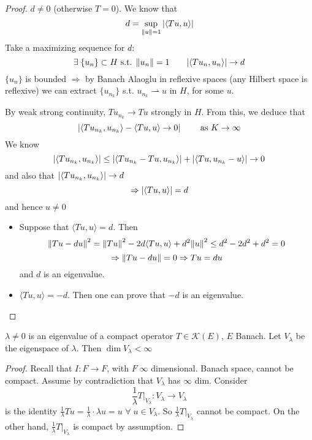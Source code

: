 \begin{proof}
    \(d \neq 0\) (otherwise \(T=0\)). We know that
    \[
        d = \sup_{\norm{u}=1} \abs{\langle Tu, u\rangle}
    \]
    Take a maximizing sequence for \(d\):
    \[
        \exists \; \{u_n\} \subset H \text{ s.t. } \norm{u_n}=1 \qquad \abs{\langle Tu_n, u_n\rangle} \to d    
    \]
    \(\{u_n\}\) is bounded \(\Rightarrow\) by Banach Alaoglu in reflexive spaces (any Hilbert space is reflexive) we can extract \(\{u_{n_k}\}\) s.t. \(u_{n_k} \rightharpoonup u\)  in \(H\), for some \(u\).

    By weak strong continuity, \(T u_{n_k} \to Tu\) strongly in \(H\). From this, we deduce that 
    \[
        \abs{ \langle T u_{n_k}, u_{n_k}\rangle - \langle Tu, u\rangle \to 0} \qquad \text{ as } K \to \infty    
    \]
    We know
    \[
        \abs{ \langle Tu_{n_k}, u_{n_k}\rangle} \leq \abs{\langle T u_{n_k} - Tu, u_{n_k}\rangle} + \abs{ \langle Tu, u_{n_k} - u\rangle} \to 0
    \]
    and also that \(\abs{\langle T u_{n_k}, u_{n_k}\rangle} \to d\)
    \[
        \Rightarrow \abs{\langle Tu, u\rangle} = d
    \]
    and hence \(u \neq 0\)

    \begin{itemize}
        \item Suppose that \(\langle Tu, u\rangle = d\). Then
        \[
            \norm{Tu- du}^2 = \norm{Tu}^2 - 2d \langle Tu, u\rangle + d^2 \norm{u}^2 \leq d^2 - 2d^2 + d^2 = 0
        \]
        \[
            \Rightarrow \norm{Tu - du} = 0 \Rightarrow Tu = du
        \]
        and \(d\) is an eigenvalue.
        \item \(\langle Tu, u\rangle = -d\). Then one can prove that \(-d\) is an eigenvalue.
    \end{itemize}
\end{proof}

\begin{proposition}
    \(\lambda \neq 0\) is an eigenvalue of a compact operator \(T \in \mathcal{K}(E)\), \(E \) Banach. Let \(V_\lambda\) be the eigenspace of \(\lambda\). Then \(\dim V_\lambda < \infty\)
\end{proposition}
\begin{proof}
    Recall that \(I: F \to F \), with \(F  \; \infty\) dimensional. Banach space, cannot be compact. Assume by contradiction that \(V_\lambda\) has \(\infty\) dim. Consider
    \[
        \frac{1}{\lambda} T |_{V_\lambda}: V_\lambda \to V_\lambda 
    \]
    is the identity \(\frac{1}{\lambda} T u = \frac{1}{\lambda} \cdot \lambda u = u\) \(\forall\; u \in V_\lambda\). 
    So \(\frac{1}{\lambda} T |_{V_\lambda}\) cannot be compact. On the other hand, \(\frac{1}{\lambda} T |_{V_\lambda}\) is compact by assumption.
\end{proof}

